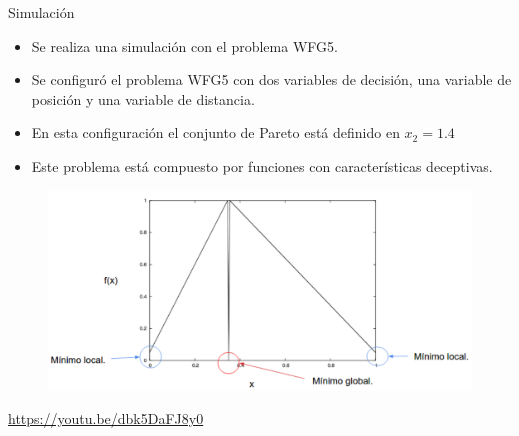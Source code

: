 \documentclass{beamer}
\newcommand{\HV}{{\sc hv}}
\begin{document}
\begin{frame}{Simulación}
\begin{itemize}
\scriptsize
\justifying
\item Se realiza una simulación con el problema WFG5.
\item Se configuró el problema WFG5 con dos variables de decisión, una variable de posición y una variable de distancia.
\item En esta configuración el conjunto de Pareto está definido en $x_2 = 1.4$
\item Este problema está compuesto por funciones con características deceptivas.
\end{itemize}
\begin{figure}[t]
\centering
\includegraphics[scale=0.2]{Images/deceptiva_wfg5.png} \\
\end{figure}
\centering
\url{https://youtu.be/dbk5DaFJ8y0}
\end{frame}
\end{document}
